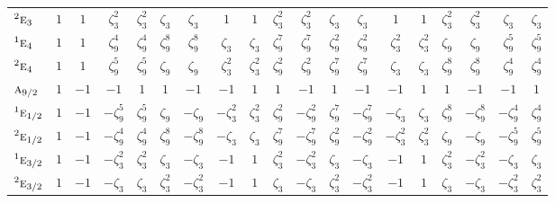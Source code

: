 \documentclass[10pt,a4paper]{article}
\makeatletter
\def\grouprule#1#2{\noalign{\marks\LTgroupmarks{\the\belowrulesep}\nobreak\vskip#1%
  \vskip\aboverulesep}\multispan\LT@cols\unskip{\leaders\hrule\@height#2\hfill\kern\z@}\cr
  \noalign{\penalty\LTrulebreak\vskip\belowrulesep\global\@lastruleclass\z@}}
\numberwithin{equation}{section}
\newcommand{\irr}[1]{\text{\normalfont\scshape #1}}
\newcommand{\conjpair}[1]{{}^{#1}}
\newcommand{\rootunity}[1]{\zeta_{#1}}
\makeatother
\begin{document}
{\begin{longtable}{@{}lcccccccccccccccccc@{}}
$\conjpair{2}\irr{e}_{3}$ & $1$ & $1$ & $\rootunity{3}^{2}$ & $\rootunity{3}^{2}$ & $\rootunity{3}$ & $\rootunity{3}$ & $1$ & $1$ & $\rootunity{3}^{2}$ & $\rootunity{3}^{2}$ & $\rootunity{3}$ & $\rootunity{3}$ & $1$ & $1$ & $\rootunity{3}^{2}$ & $\rootunity{3}^{2}$ & $\rootunity{3}$ & $\rootunity{3}$\\
$\conjpair{1}\irr{e}_{4}$ & $1$ & $1$ & $\rootunity{9}^{4}$ & $\rootunity{9}^{4}$ & $\rootunity{9}^{8}$ & $\rootunity{9}^{8}$ & $\rootunity{3}$ & $\rootunity{3}$ & $\rootunity{9}^{7}$ & $\rootunity{9}^{7}$ & $\rootunity{9}^{2}$ & $\rootunity{9}^{2}$ & $\rootunity{3}^{2}$ & $\rootunity{3}^{2}$ & $\rootunity{9}$ & $\rootunity{9}$ & $\rootunity{9}^{5}$ & $\rootunity{9}^{5}$\\
$\conjpair{2}\irr{e}_{4}$ & $1$ & $1$ & $\rootunity{9}^{5}$ & $\rootunity{9}^{5}$ & $\rootunity{9}$ & $\rootunity{9}$ & $\rootunity{3}^{2}$ & $\rootunity{3}^{2}$ & $\rootunity{9}^{2}$ & $\rootunity{9}^{2}$ & $\rootunity{9}^{7}$ & $\rootunity{9}^{7}$ & $\rootunity{3}$ & $\rootunity{3}$ & $\rootunity{9}^{8}$ & $\rootunity{9}^{8}$ & $\rootunity{9}^{4}$ & $\rootunity{9}^{4}$\\
\grouprule{0pt}{\lightrulewidth}
$\irr{a}_{9/2}$ & $1$ & $-1$ & $-1$ & $1$ & $1$ & $-1$ & $-1$ & $1$ & $1$ & $-1$ & $1$ & $-1$ & $-1$ & $1$ & $1$ & $-1$ & $-1$ & $1$\\
$\conjpair{1}\irr{e}_{1/2}$ & $1$ & $-1$ & $-\rootunity{9}^{5}$ & $\rootunity{9}^{5}$ & $\rootunity{9}$ & $-\rootunity{9}$ & $-\rootunity{3}^{2}$ & $\rootunity{3}^{2}$ & $\rootunity{9}^{2}$ & $-\rootunity{9}^{2}$ & $\rootunity{9}^{7}$ & $-\rootunity{9}^{7}$ & $-\rootunity{3}$ & $\rootunity{3}$ & $\rootunity{9}^{8}$ & $-\rootunity{9}^{8}$ & $-\rootunity{9}^{4}$ & $\rootunity{9}^{4}$\\
$\conjpair{2}\irr{e}_{1/2}$ & $1$ & $-1$ & $-\rootunity{9}^{4}$ & $\rootunity{9}^{4}$ & $\rootunity{9}^{8}$ & $-\rootunity{9}^{8}$ & $-\rootunity{3}$ & $\rootunity{3}$ & $\rootunity{9}^{7}$ & $-\rootunity{9}^{7}$ & $\rootunity{9}^{2}$ & $-\rootunity{9}^{2}$ & $-\rootunity{3}^{2}$ & $\rootunity{3}^{2}$ & $\rootunity{9}$ & $-\rootunity{9}$ & $-\rootunity{9}^{5}$ & $\rootunity{9}^{5}$\\
$\conjpair{1}\irr{e}_{3/2}$ & $1$ & $-1$ & $-\rootunity{3}^{2}$ & $\rootunity{3}^{2}$ & $\rootunity{3}$ & $-\rootunity{3}$ & $-1$ & $1$ & $\rootunity{3}^{2}$ & $-\rootunity{3}^{2}$ & $\rootunity{3}$ & $-\rootunity{3}$ & $-1$ & $1$ & $\rootunity{3}^{2}$ & $-\rootunity{3}^{2}$ & $-\rootunity{3}$ & $\rootunity{3}$\\
$\conjpair{2}\irr{e}_{3/2}$ & $1$ & $-1$ & $-\rootunity{3}$ & $\rootunity{3}$ & $\rootunity{3}^{2}$ & $-\rootunity{3}^{2}$ & $-1$ & $1$ & $\rootunity{3}$ & $-\rootunity{3}$ & $\rootunity{3}^{2}$ & $-\rootunity{3}^{2}$ & $-1$ & $1$ & $\rootunity{3}$ & $-\rootunity{3}$ & $-\rootunity{3}^{2}$ & $\rootunity{3}^{2}$\\

\end{longtable}}
\end{document}
